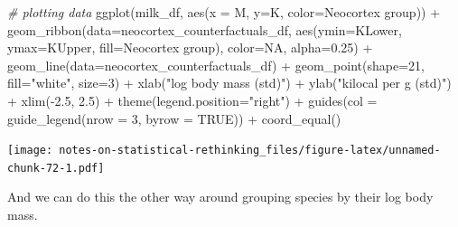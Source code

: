 \documentclass[
]{book}
\newenvironment{Shaded}{\begin{snugshade}}{\end{snugshade}}
\newcommand{\AttributeTok}[1]{\textcolor[rgb]{0.77,0.63,0.00}{#1}}
\newcommand{\CommentTok}[1]{\textcolor[rgb]{0.56,0.35,0.01}{\textit{#1}}}
\newcommand{\ConstantTok}[1]{\textcolor[rgb]{0.00,0.00,0.00}{#1}}
\newcommand{\DecValTok}[1]{\textcolor[rgb]{0.00,0.00,0.81}{#1}}
\newcommand{\FloatTok}[1]{\textcolor[rgb]{0.00,0.00,0.81}{#1}}
\newcommand{\FunctionTok}[1]{\textcolor[rgb]{0.00,0.00,0.00}{#1}}
\newcommand{\NormalTok}[1]{#1}
\newcommand{\SpecialCharTok}[1]{\textcolor[rgb]{0.00,0.00,0.00}{#1}}
\newcommand{\StringTok}[1]{\textcolor[rgb]{0.31,0.60,0.02}{#1}}
\begin{document}
\begin{Shaded}
\begin{Highlighting}[]
\CommentTok{\# plotting data}
\FunctionTok{ggplot}\NormalTok{(milk\_df, }\FunctionTok{aes}\NormalTok{(}\AttributeTok{x =}\NormalTok{ M, }\AttributeTok{y=}\NormalTok{K, }\AttributeTok{color=}\StringTok{\textasciigrave{}}\AttributeTok{Neocortex group}\StringTok{\textasciigrave{}}\NormalTok{)) }\SpecialCharTok{+} 
  \FunctionTok{geom\_ribbon}\NormalTok{(}\AttributeTok{data=}\NormalTok{neocortex\_counterfactuals\_df, }\FunctionTok{aes}\NormalTok{(}\AttributeTok{ymin=}\NormalTok{KLower, }\AttributeTok{ymax=}\NormalTok{KUpper, }\AttributeTok{fill=}\StringTok{\textasciigrave{}}\AttributeTok{Neocortex group}\StringTok{\textasciigrave{}}\NormalTok{), }\AttributeTok{color=}\ConstantTok{NA}\NormalTok{, }\AttributeTok{alpha=}\FloatTok{0.25}\NormalTok{) }\SpecialCharTok{+}
  \FunctionTok{geom\_line}\NormalTok{(}\AttributeTok{data=}\NormalTok{neocortex\_counterfactuals\_df) }\SpecialCharTok{+}
  \FunctionTok{geom\_point}\NormalTok{(}\AttributeTok{shape=}\DecValTok{21}\NormalTok{, }\AttributeTok{fill=}\StringTok{"white"}\NormalTok{, }\AttributeTok{size=}\DecValTok{3}\NormalTok{) }\SpecialCharTok{+}
  \FunctionTok{xlab}\NormalTok{(}\StringTok{"log body mass (std)"}\NormalTok{) }\SpecialCharTok{+} 
  \FunctionTok{ylab}\NormalTok{(}\StringTok{"kilocal per g (std)"}\NormalTok{) }\SpecialCharTok{+} 
  \FunctionTok{xlim}\NormalTok{(}\SpecialCharTok{{-}}\FloatTok{2.5}\NormalTok{, }\FloatTok{2.5}\NormalTok{) }\SpecialCharTok{+}
  \FunctionTok{theme}\NormalTok{(}\AttributeTok{legend.position=}\StringTok{"right"}\NormalTok{) }\SpecialCharTok{+}
  \FunctionTok{guides}\NormalTok{(}\AttributeTok{col =} \FunctionTok{guide\_legend}\NormalTok{(}\AttributeTok{nrow =} \DecValTok{3}\NormalTok{, }\AttributeTok{byrow =} \ConstantTok{TRUE}\NormalTok{)) }\SpecialCharTok{+}
  \FunctionTok{coord\_equal}\NormalTok{()}
\end{Highlighting}
\end{Shaded}

\texttt{[image: notes-on-statistical-rethinking\_files/figure-latex/unnamed-chunk-72-1.pdf]}

And we can do this the other way around grouping species by their log body mass.
\end{document}
